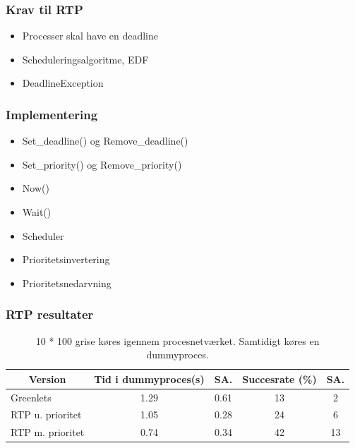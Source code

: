 \documentclass[12pt]{beamer}
\newcommand\mc[1]{\multicolumn{1}{c}{\textbf {#1}}} %
\begin{document}
\begin{frame}
  \frametitle{Krav til RTP}
  \begin{itemize}   
	\item Processer skal have en  deadline
	\item Scheduleringsalgoritme, EDF
	\item DeadlineException
  \end{itemize}
\end{frame}

\begin{frame}
  \frametitle{Implementering}
  \begin{itemize}   
    \item Set\_deadline() og Remove\_deadline()
    \item Set\_priority() og Remove\_priority()
    \item Now()
    \item Wait()
    \item Scheduler 
	\item Prioritetsinvertering
	\item Prioritetsnedarvning
  \end{itemize}
\end{frame}





\begin{frame}
  	\frametitle{RTP resultater}
	\tiny 
	\begin{table}[htbp]
		\centering
		\begin{tabular}{lcccc}
		   	\toprule
		    \mc{Version}&\mc{Tid i dummyproces(s)}&\mc{SA.}& \mc{Succesrate (\%)}&\mc{SA.}\\
		    \midrule
		    Greenlets         & 1.29 & 0.61 & 13 & 2  \\
		    RTP u. prioritet  & 1.05 & 0.28 & 24 & 6  \\
		    RTP m. prioritet  & 0.74 & 0.34 & 42 & 13 \\
		    \bottomrule
		\end{tabular}
		\caption[]{\tiny 10 * 100 grise køres igennem procesnetværket. Samtidigt køres en dummyproces.}
	\end{table}
\end{frame}
\end{document}
